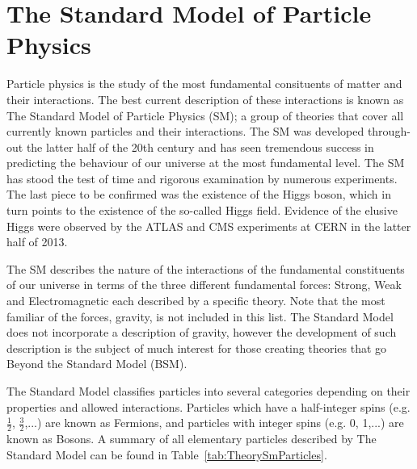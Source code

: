 \newcommand{\CommonElementTextFormat}[4]
{
  \begin{minipage}{3cm}
    \centering
      {\textbf{#1} \hfill #2}%
      \linebreak \linebreak
      {\textbf{#3}}%
      \linebreak \linebreak
      {{#4}}
  \end{minipage}
}

\newcommand{\NaturalElementTextFormat}[4]
{
  \CommonElementTextFormat{#1}{#2}{\LARGE {#3}}{#4}
}

\chapter{The Standard Model of Particle Physics} \label{sec:the_standard_model_of_particle_physics}
Particle physics is the study of the most fundamental consituents of matter and their interactions. The best current description of these interactions is known as The Standard Model of Particle Physics (SM); a group of theories that cover all currently known particles and their interactions. The SM was developed through-out the latter half of the 20th century and has seen tremendous success in predicting the behaviour of our universe at the most fundamental level. The SM has stood the test of time and rigorous examination by numerous experiments. The last piece to be confirmed was the existence of the Higgs boson, which in turn points to the existence of the so-called Higgs field. Evidence of the elusive Higgs were observed by the ATLAS and CMS experiments at CERN in the latter half of 2013.

The SM describes the nature of the interactions of the fundamental constituents of our universe in terms of the three different fundamental forces: Strong, Weak and Electromagnetic each described by a specific theory. Note that the most familiar of the forces, gravity, is not included in this list. The Standard Model does not incorporate a description of gravity, however the development of such description is the subject of much interest for those creating theories that go Beyond the Standard Model (BSM).

The Standard Model classifies particles into several categories depending on their properties and allowed interactions. Particles which have a half-integer spins (e.g. $\frac{1}{2}$, $\frac{3}{2}$,...) are known as Fermions, and particles with integer spins (e.g. 0, 1,...) are known as Bosons. A summary of all elementary particles described by The Standard Model can be found in Table~\ref{tab:TheorySmParticles}.

